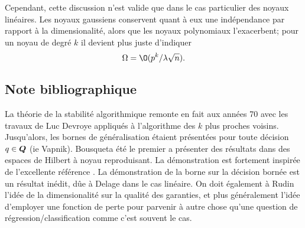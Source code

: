 Cependant, cette discussion n'est valide que dans le cas particulier des noyaux
linéaires. Les noyaux gaussiens conservent quant à eux une indépendance par rapport à la
dimensionalité, alors que les noyaux polynomiaux l'exacerbent; pour un noyau de degré $k$
il devient plus juste d'indiquer
\begin{equation}
  \Omega = \O(p^k/\lambda\sqrt{n}).
\end{equation}


\subsection{Note bibliographique}

La théorie de la stabilité algorithmique remonte en fait aux années 70 avec les travaux de
Luc Devroye appliqués à l'algorithme des $k$ plus proches voisins\cit. Jusqu'alors, les
bornes de généralisation étaient présentées pour toute décision $q \in \bm Q$ (ie
Vapnik). Bousquet\cit a été le premier a présenter des résultats dans des espaces de
Hilbert à noyau reproduisant. La démonstration est fortement inspirée de l'excellente
référence \cite{mohri2012foundations}. La démonstration de la borne sur la décision bornée
est un résultat inédit, dûe à Delage dans le cas linéaire. On doit également à Rudin
l'idée de la dimensionalité sur la qualité des garanties, et plus généralement l'idée
d'employer une fonction de perte pour parvenir à autre chose qu'une question de
régression/classification comme c'est souvent le cas.




